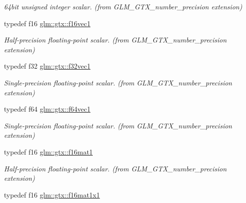 \begin{DoxyCompactItemize}
\begin{DoxyCompactList}\small\item\em 64bit unsigned integer scalar. (from G\+L\+M\+\_\+\+G\+T\+X\+\_\+number\+\_\+precision extension) \end{DoxyCompactList}\item 
\hypertarget{group__gtx__number__precision_ga77db1db381ebb9ad9d56e6af72a904a3}{}typedef f16 \hyperlink{group__gtx__number__precision_ga77db1db381ebb9ad9d56e6af72a904a3}{glm\+::gtx\+::f16vec1}\label{group__gtx__number__precision_ga77db1db381ebb9ad9d56e6af72a904a3}

\begin{DoxyCompactList}\small\item\em Half-\/precision floating-\/point scalar. (from G\+L\+M\+\_\+\+G\+T\+X\+\_\+number\+\_\+precision extension) \end{DoxyCompactList}\item 
\hypertarget{group__gtx__number__precision_gadab8e598b0b4697629482682bdb7f223}{}typedef f32 \hyperlink{group__gtx__number__precision_gadab8e598b0b4697629482682bdb7f223}{glm\+::gtx\+::f32vec1}\label{group__gtx__number__precision_gadab8e598b0b4697629482682bdb7f223}

\begin{DoxyCompactList}\small\item\em Single-\/precision floating-\/point scalar. (from G\+L\+M\+\_\+\+G\+T\+X\+\_\+number\+\_\+precision extension) \end{DoxyCompactList}\item 
\hypertarget{group__gtx__number__precision_ga44336a26c958d66efdfb5a6c114c538e}{}typedef f64 \hyperlink{group__gtx__number__precision_ga44336a26c958d66efdfb5a6c114c538e}{glm\+::gtx\+::f64vec1}\label{group__gtx__number__precision_ga44336a26c958d66efdfb5a6c114c538e}

\begin{DoxyCompactList}\small\item\em Single-\/precision floating-\/point scalar. (from G\+L\+M\+\_\+\+G\+T\+X\+\_\+number\+\_\+precision extension) \end{DoxyCompactList}\item 
\hypertarget{group__gtx__number__precision_ga5c6aa32319299805b56c8cc81e718553}{}typedef f16 \hyperlink{group__gtx__number__precision_ga5c6aa32319299805b56c8cc81e718553}{glm\+::gtx\+::f16mat1}\label{group__gtx__number__precision_ga5c6aa32319299805b56c8cc81e718553}

\begin{DoxyCompactList}\small\item\em Half-\/precision floating-\/point scalar. (from G\+L\+M\+\_\+\+G\+T\+X\+\_\+number\+\_\+precision extension) \end{DoxyCompactList}\item 
\hypertarget{group__gtx__number__precision_ga1114c8f46b8b795247589b0914dbce5e}{}typedef f16 \hyperlink{group__gtx__number__precision_ga1114c8f46b8b795247589b0914dbce5e}{glm\+::gtx\+::f16mat1x1}\label{group__gtx__number__precision_ga1114c8f46b8b795247589b0914dbce5e}


\end{DoxyCompactItemize}
